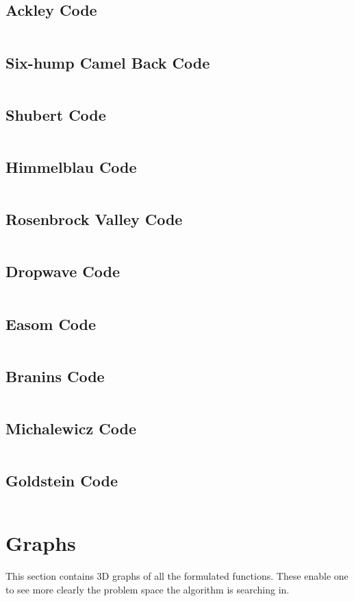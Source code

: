 \subsection{Ackley Code}
\inputminted[fontsize=\tiny]{python}{./Graphs/Ackley.py}
\subsection{Six-hump Camel Back Code}
\inputminted[fontsize=\tiny]{python}{./Graphs/Camel.py}
\subsection{Shubert Code}
\inputminted[fontsize=\tiny]{python}{./Graphs/Shubert.py}
\subsection{Himmelblau Code}
\inputminted[fontsize=\tiny]{python}{./Graphs/Himmelblau.py}
\subsection{Rosenbrock Valley Code}
\inputminted[fontsize=\tiny]{python}{./Graphs/Rosenbrock.py}
\subsection{Dropwave Code}
\inputminted[fontsize=\tiny]{python}{./Graphs/Dropwave.py}
\subsection{Easom Code}
\inputminted[fontsize=\tiny]{python}{./Graphs/Easom.py}
\subsection{Branins Code}
\inputminted[fontsize=\tiny]{python}{./Graphs/Branin.py}
\subsection{Michalewicz Code}
\inputminted[fontsize=\tiny]{python}{./Graphs/Michalewicz.py}
\subsection{Goldstein Code}
\inputminted[fontsize=\tiny]{python}{./Graphs/Goldstein.py}
\section{Graphs}
This section contains 3D graphs of all the formulated functions. These enable one to see more clearly the problem space the algorithm is searching in.

